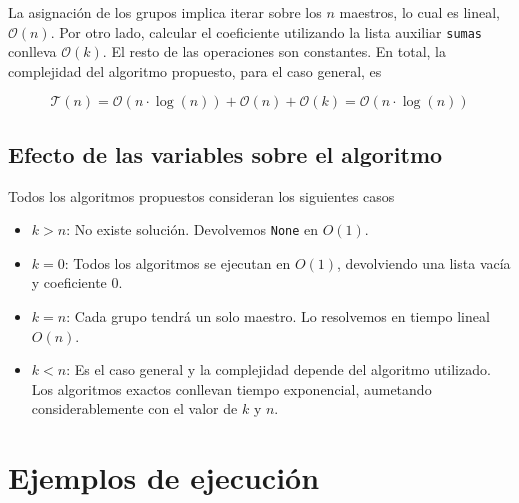 \documentclass{article}
\begin{document}
La asignación de los grupos implica iterar sobre los $n$ maestros, lo cual es lineal, $\mathcal{O}(n)$. Por otro lado, calcular el coeficiente utilizando la lista auxiliar \texttt{sumas} conlleva $\mathcal{O}(k)$. El resto de las operaciones son constantes. En total, la complejidad del algoritmo propuesto, para el caso general, es

$$
\mathcal{T}(n) = \mathcal{O}(n \cdot \log (n)) + \mathcal{O}(n) + \mathcal{O}(k) = \mathcal{O}(n \cdot \log (n))
$$

\subsection{Efecto de las variables sobre el algoritmo}
Todos los algoritmos propuestos consideran los siguientes casos
\begin{itemize}
    \item $k > n$: No existe solución. Devolvemos \texttt{None} en $O(1)$.
    \item $k = 0$: Todos los algoritmos se ejecutan en $O(1)$, devolviendo una lista vacía y coeficiente 0. 
    \item $k = n$: Cada grupo tendrá un solo maestro. Lo resolvemos en tiempo lineal $O(n)$.
    \item $k < n$: Es el caso general y la complejidad depende del algoritmo utilizado. Los algoritmos exactos conllevan tiempo exponencial, aumetando considerablemente con el valor de $k$ y $n$.
\end{itemize}

\section{Ejemplos de ejecución}
\label{sec:ejemplos}
\end{document}

